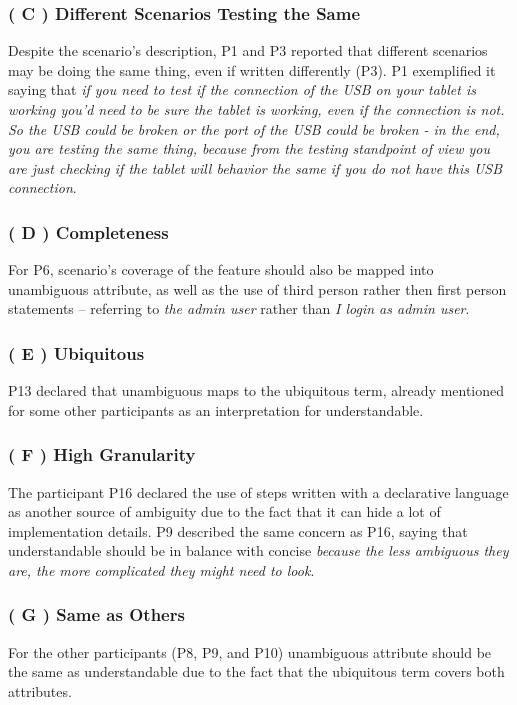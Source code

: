 \subsubsection{\textbf{( C ) Different Scenarios Testing the Same}}
Despite the scenario's description, P1 and P3 reported that different scenarios may be doing the same thing, even if written differently (P3). P1 exemplified it saying that \textit{if you need to test if the connection of the USB on your tablet is working you'd need to be sure the tablet is working, even if the connection is not. So the USB could be broken or the port of the USB could be broken - in the end, you are testing the same thing, because from the testing standpoint of view you are just checking if the tablet will behavior the same if you do not have this USB connection}. 

\subsubsection{\textbf{( D ) Completeness}}
For P6, scenario's coverage of the feature should also be mapped into unambiguous attribute, as well as the use of third person rather then first person statements -- referring to \textit{the admin user} rather than \textit{I login as admin user}.

\subsubsection{\textbf{( E ) Ubiquitous}}
P13 declared that unambiguous maps to the ubiquitous term, already mentioned for some other participants as an interpretation for understandable.

\subsubsection{\textbf{( F ) High Granularity}}
The participant P16 declared the use of steps written with a declarative language as another source of ambiguity due to the fact that it can hide a lot of implementation details. P9 described the same concern as P16, saying that understandable should be in balance with concise \textit{because the less ambiguous they are, the more complicated they might need to look}.

\subsubsection{\textbf{( G ) Same as Others}}
For the other participants (P8, P9, and P10) unambiguous attribute should be the same as understandable due to the fact that the ubiquitous term covers both attributes. 

